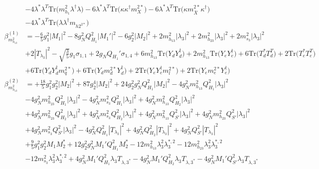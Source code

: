 {\begin{align}
 &-4 {\lambda^*  \lambda^{T}} \mbox{Tr}\Big({m_{h_1}^2  \lambda^{\dagger}  \lambda}\Big) -6 {\lambda^*  \lambda^{T}} \mbox{Tr}\Big({\kappa  \kappa^{\dagger}  m_{X}^{2 *}}\Big) -6 {\lambda^*  \lambda^{T}} \mbox{Tr}\Big({\kappa  m_{\bar{X}}^{2 *}  \kappa^{\dagger}}\Big) \nonumber \\ 
 &-4 {\lambda^*  \lambda^{T}} \mbox{Tr}\Big({\lambda  \lambda^{\dagger}  m_{{h 2}^{2 *}}}\Big) \\ 
\beta_{m_{h_{13}}^2}^{(1)} & =  
-\frac{6}{5} g_{1}^{2} |M_1|^2 -8 g_{N}^{2} Q_{H_1}^{2} |M_1'|^2 -6 g_{2}^{2} |M_2|^2 +2 m_{h_{13}}^2 |\lambda_3|^2 +2 m_{h_{23}}^2 |\lambda_3|^2 +2 m_{s_3}^2 |\lambda_3|^2 \nonumber \\ 
 &+2 |T_{\lambda_3}|^2 - \sqrt{\frac{3}{5}} g_1 \sigma_{1,1} +2 g_N Q_{H_1}' \sigma_{1,4} +6 m_{h_{13}}^2 \mbox{Tr}\Big({Y_d  Y_{d}^{\dagger}}\Big) +2 m_{h_{13}}^2 \mbox{Tr}\Big({Y_e  Y_{e}^{\dagger}}\Big) +6 \mbox{Tr}\Big({T_d^*  T_{d}^{T}}\Big) +2 \mbox{Tr}\Big({T_e^*  T_{e}^{T}}\Big) \nonumber \\ 
 &+6 \mbox{Tr}\Big({Y_d  Y_{d}^{\dagger}  m_q^{2 *}}\Big) +6 \mbox{Tr}\Big({Y_d  m_d^{2 *}  Y_{d}^{\dagger}}\Big) +2 \mbox{Tr}\Big({Y_e  Y_{e}^{\dagger}  m_l^{2 *}}\Big) +2 \mbox{Tr}\Big({Y_e  m_e^{2 *}  Y_{e}^{\dagger}}\Big) \\ 
\beta_{m_{h_{13}}^2}^{(2)} & =  
+\frac{18}{5} g_{1}^{2} g_{2}^{2} |M_2|^2 +87 g_{2}^{4} |M_2|^2 +24 g_{2}^{2} g_{N}^{2} Q_{H_1}^{2} |M_2|^2 -4 g_{N}^{2} m_{h_{13}}^2 Q_{H_1}^{2} |\lambda_3|^2 \nonumber \\ 
 &-4 g_{N}^{2} m_{h_{23}}^2 Q_{H_1}^{2} |\lambda_3|^2 -4 g_{N}^{2} m_{s_3}^2 Q_{H_1}^{2} |\lambda_3|^2 +4 g_{N}^{2} m_{h_{13}}^2 Q_{H_2}^{2} |\lambda_3|^2 \nonumber \\ 
 &+4 g_{N}^{2} m_{h_{23}}^2 Q_{H_2}^{2} |\lambda_3|^2 +4 g_{N}^{2} m_{s_3}^2 Q_{H_2}^{2} |\lambda_3|^2 +4 g_{N}^{2} m_{h_{13}}^2 Q_{S'}^{2} |\lambda_3|^2 +4 g_{N}^{2} m_{h_{23}}^2 Q_{S'}^{2} |\lambda_3|^2 \nonumber \\ 
 &+4 g_{N}^{2} m_{s_3}^2 Q_{S'}^{2} |\lambda_3|^2 -4 g_{N}^{2} Q_{H_1}^{2} |T_{\lambda_3}|^2 +4 g_{N}^{2} Q_{H_2}^{2} |T_{\lambda_3}|^2 +4 g_{N}^{2} Q_{S'}^{2} |T_{\lambda_3}|^2 \nonumber \\ 
 &+\frac{9}{5} g_{1}^{2} g_{2}^{2} M_1 M_2^* +12 g_{2}^{2} g_{N}^{2} M_1' Q_{H_1}^{2} M_2^* -12 m_{h_{13}}^2 \lambda_{3}^{2} \lambda_{3}^{*,2} -12 m_{h_{23}}^2 \lambda_{3}^{2} \lambda_{3}^{*,2} \nonumber \\ 
 &-12 m_{s_3}^2 \lambda_{3}^{2} \lambda_{3}^{*,2} +4 g_{N}^{2} M_1' Q_{H_1}^{2} \lambda_3 T_{{\lambda,3}^*} -4 g_{N}^{2} M_1' Q_{H_2}^{2} \lambda_3 T_{{\lambda,3}^*} -4 g_{N}^{2} M_1' Q_{S'}^{2} \lambda_3 T_{{\lambda,3}^*} \nonumber \\ 

\end{align}}
